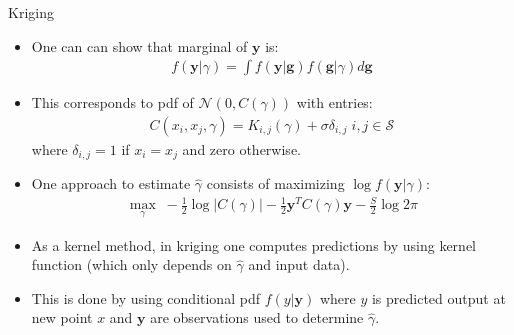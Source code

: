 \documentclass[9pt]{beamer}
\begin{document}

\begin{frame}{Kriging}

\begin{itemize}
 
\item One can can show that marginal of $\mathbf{y}$ is:
\begin{align*}
f(\mathbf{y}|\gamma)=\int f(\mathbf{y}|\mathbf{g})f(\mathbf{g}|\gamma)d\mathbf{g}
\end{align*}
\item This corresponds to pdf of $\mathcal{N}(0,C(\gamma))$ with entries:
\begin{align*}
C(x_i,x_j,\gamma)=K_{i,j}(\gamma)+\sigma \delta_{i,j}\; i,j\in \mathcal{S}
\end{align*}
where $\delta_{i,j}=1$ if $x_i=x_j$ and zero otherwise. 

\item One approach to estimate $\hat{\gamma}$ consists of maximizing $\log f(\mathbf{y}|\gamma)$:
\begin{align*}
\max_\gamma \; -\frac{1}{2}\log|C(\gamma)|-\frac{1}{2}\mathbf{y}^TC(\gamma)\mathbf{y}-\frac{S}{2}\log 2\pi
\end{align*}

\item As a kernel method, in kriging one computes predictions by using kernel function (which only depends on $\hat{\gamma}$ and input data).

\item This is done by using conditional pdf $f(y|\mathbf{y})$  where $y$ is predicted output at new point $x$ and $\mathbf{y}$ are observations used to determine $\hat{\gamma}$.

\end{itemize}


\end{frame}

\end{document}
